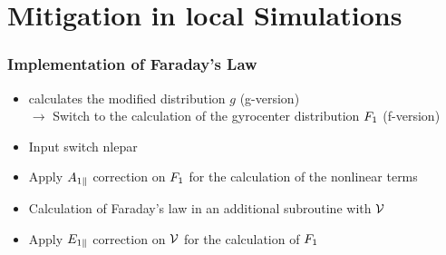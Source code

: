 \documentclass[compress,aspectratio=1610,noflama]{beamer}
\newcommand{\code}[1]{{\ttfamily\small{#1}}}
\begin{document}
	\section*{Mitigation in local Simulations}

	\begin{frame}
		\frametitle{Implementation of Faraday's Law}
		
		 {}

		\begin{itemize}
			\item <2-> {\gkw} calculates the modified distribution $g$ (g-version)\\
			$\rightarrow$ Switch to the calculation of the gyrocenter distribution $F_1$ (f-version)
			\item <3-> Input switch \code{nlepar}
			\item <4-> Apply $A_{1\parallel}$ correction on $F_1$ for the calculation of the nonlinear terms
			\item <5-> Calculation of Faraday's law in an additional subroutine with $\mathcal{V}$ 
			\item <6-> Apply $E_{1\parallel}$ correction on $\mathcal{V}$ for the calculation of $F_1$
		\end{itemize}
	
	\end{frame}
\end{document}
